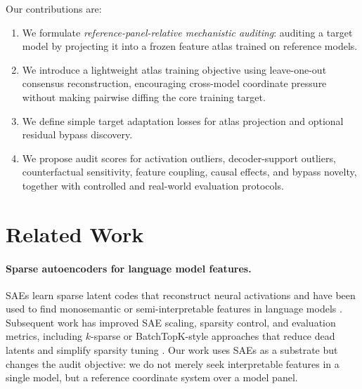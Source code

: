 \documentclass[11pt]{article}
\begin{document}
Our contributions are:
\begin{enumerate}[leftmargin=*]
    \item We formulate \emph{reference-panel-relative mechanistic auditing}: auditing a target model by projecting it into a frozen feature atlas trained on reference models.
    \item We introduce a lightweight atlas training objective using leave-one-out consensus reconstruction, encouraging cross-model coordinate pressure without making pairwise diffing the core training target.
    \item We define simple target adaptation losses for atlas projection and optional residual bypass discovery.
    \item We propose audit scores for activation outliers, decoder-support outliers, counterfactual sensitivity, feature coupling, causal effects, and bypass novelty, together with controlled and real-world evaluation protocols.
\end{enumerate}

\section{Related Work}

\paragraph{Sparse autoencoders for language model features.}
SAEs learn sparse latent codes that reconstruct neural activations and have been used to find monosemantic or semi-interpretable features in language models \citep{bricken2023monosemanticity}. Subsequent work has improved SAE scaling, sparsity control, and evaluation metrics, including $k$-sparse or BatchTopK-style approaches that reduce dead latents and simplify sparsity tuning \citep{gao2024scaling}. Our work uses SAEs as a substrate but changes the audit objective: we do not merely seek interpretable features in a single model, but a reference coordinate system over a model panel.
\end{document}
